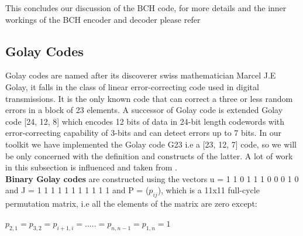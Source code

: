 This concludes our discussion of the BCH code, for more details and the inner workings of the BCH encoder and decoder please refer \cite{66}

\subsection{Golay Codes}
\label{golay_related}
Golay codes are named after its discoverer swiss mathematician Marcel J.E Golay, it falls in the class of linear error-correcting code used in digital transmissions. It is the only known code that can correct a three or less random errors in a block of 23 elements. A successor of Golay code is extended Golay code [24, 12, 8] which encodes 12 bits of data in 24-bit length codewords with error-correcting capability of 3-bits and can detect errors up to 7 bits. In our toolkit we have implemented
the Golay code G23 i.e a [23, 12, 7] code, so we will be only concerned with the definition and constructs of the latter. A lot of work in this subsection is influenced and taken from \cite{golay}.\\

\textbf{Binary Golay codes} are constructed using the vectors u = 1 1 0 1 1 1 0 0 0 1 0 and J = 1 1 1 1 1 1 1 1 1 1 1 and P = ($p_{ij}$), which is a 11x11 full-cycle permutation matrix, i.e all the elements of the matrix are zero except:

\tab \tab \tab $p_{2,1} = p_{3,2} = p_{i+1,i} = . . . . . = p_{n,n-1} = p_{1,n} = 1$

